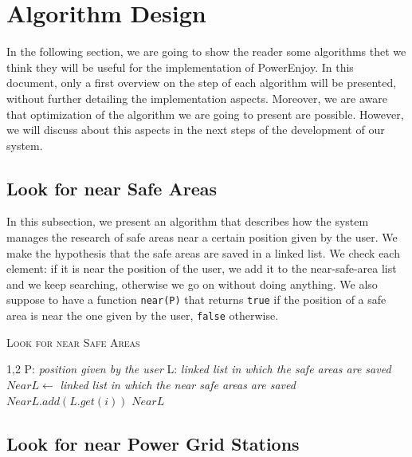 \section{Algorithm Design} \label{sec:algo}

In the following section, we are going to show the reader some algorithms thet we think they will be useful for the implementation of PowerEnjoy.
In this document, only a first overview on the step of each algorithm will be presented, without further detailing the implementation aspects. Moreover, we are aware that optimization of the algorithm we are going to present are possible.
However, we will discuss about this aspects in the next steps of the development of our system.

\subsection{Look for near Safe Areas} \label{subsec:near-safe-area}

In this subsection, we present an algorithm that describes how the system manages the research of safe areas near a certain position given by the user. 
We make the hypothesis that the safe areas are saved in a linked list.
We check each element: if it is near the position of the user, we add it to the near-safe-area list and we keep searching, otherwise we go on without doing anything.
We also suppose to have a function \texttt{near(P)} that returns \texttt{true} if the position of a safe area is near the one given by the user, \texttt{false} otherwise.

\vspace{32pt}
\begin{algorithm}[h!tb]
\caption{\textsc{Look for near Safe Areas}}
\label{alg:near-safe-area}
\begin{algorithmic}[1]
\begin{spacing}{1,2}
\State P: \textit{position given by the user}
\State L: \textit{linked list in which the safe areas are saved}
\State $NearL \leftarrow $ \textit{linked list in which the near safe areas are saved}
		\State $NearL.add(L.get(i))$
	\EndIf
\EndFor
\State\Return $NearL$
\EndFunction
\end{spacing}
\end{algorithmic}
\end{algorithm}

\clearpage

\subsection{Look for near Power Grid Stations} \label{subsec:near-stations}

